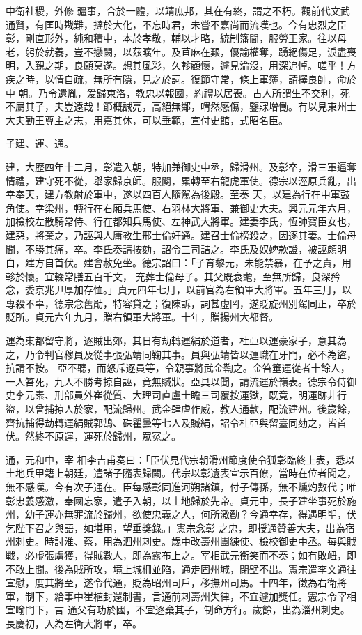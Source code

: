 \begin{pinyinscope}
 中衛社稷，外修
 疆事，合於一體，以靖庶邦，其在有終，謂之不朽。觀前代文武通賢，有匡時戡難，撻於大化，不忘時君，未嘗不嘉尚而流嘆也。今有忠烈之臣彰，剛直形外，純和積中，本於孝敬，輔以才略，統制籓閫，服勞王家。往以母老，躬於就養，豈不戀闕，以茲曠年。及苴麻在艱，優諭權奪，踴絕傷足，淚盡喪明，入覲之期，良願莫遂。想其風彩，久軫顧懷，遽見淪沒，用深追悼。嗟乎！方疾之時，以情自疏，無所有隱，見之於詞。復節守常，條上軍簿，請擇良帥，命於中
 朝。乃令遺胤，爰歸東洛，教忠以報國，約禮以居喪。古人所謂生不交利，死不屬其子，夫豈遠哉！節概誠亮，高絕無鄰，喟然感傷，鑒寐增慟。有以見東州士大夫勤王尊主之志，用嘉其休，可以垂範，宣付史館，式昭名臣。



 子建、運、通。



 建，大歷四年十二月，彰遣入朝，特加兼御史中丞，歸滑州。及彰卒，滑三軍逼奪情禮，建守死不從，舉家歸京師。服闋，累轉至右龍虎軍使。德宗以涇原兵亂，出幸奉天，建方教射於軍中，遂以四百人隨駕為後殿。至奏
 天，以建為行在中軍鼓角使。幸梁州，轉行在右廂兵馬使、右羽林大將軍、兼御史大夫。興元元年六月，加檢校左散騎常侍、行在都知兵馬使、左神武大將軍。建妻李氏，恆帥寶臣女也，建惡，將棄之，乃誣與人庸教生邢士倫奸通。建召士倫榜殺之，因逐其妻。士倫母聞，不勝其痛，卒。李氏奏請按劾，詔令三司詰之。李氏及奴婢款證，被誣頗明白，建方自首伏。建會赦免坐。德宗詔曰：「子育黎元，未能禁暴，在予之責，用軫於懷。宜輟常膳五百千文，
 充葬士倫母子。其父既衰耄，至無所歸，良深矜念，委京兆尹厚加存恤。」貞元四年七月，以前官為右領軍大將軍。五年三月，以專殺不辜，德宗念舊勛，特容貸之；復陳訴，詞甚虛罔，遂貶旋州別駕同正，卒於貶所。貞元六年九月，贈右領軍大將軍。十年，贈揚州大都督。



 運為東都留守將，逐賊出郊，其日有劫轉運絹於道者，杜亞以運豪家子，意其為之，乃令判官穆員及從事張弘靖同鞠其事。員與弘靖皆以運職在牙門，必不為盜，抗請不按。
 亞不聽，而怒斥逐員等，令親事將武金鞫之。金笞箠運從者十餘人，一人笞死，九人不勝考掠自誣，竟無贓狀。亞具以聞，請流運於嶺表。德宗令侍御史李元素、刑部員外崔從質、大理司直盧士瞻三司覆按運獄，既竟，明運跡非行盜，以曾捕掠人於家，配流歸州。武金肆虐作威，教人通款，配流建州。後歲餘，齊抗捕得劫轉運絹賊郭鵠、硃瞿曇等七人及贓絹，詔令杜亞與留臺同劾之，皆首伏。然終不原運，運死於歸州，眾冤之。



 通，元和中，宰
 相李吉甫奏曰：「臣伏見代宗朝滑州節度使令狐彰臨終上表，悉以土地兵甲籍上朝廷，遣諸子隨表歸闕。代宗以彰遺表宣示百僚，當時在位者聞之，無不感嘆。今有次子通在。臣每感彰同進河朔諸鎮，付子傳孫，無不燻灼數代；唯彰忠義感激，奉國忘家，遣子入朝，以土地歸於先帝。貞元中，長子建坐事死於施州，幼子運亦無罪流於歸州，欲使忠義之人，何所激勸？今通幸存，得遇明聖，伏乞陛下召之與語，如堪用，望垂獎錄。」憲宗念彰
 之忠，即授通贊善大夫，出為宿州刺史。時討淮、蔡，用為泗州刺史。歲中改壽州團練使、檢校御史中丞。每與賊戰，必虛張虜獲，得賊數人，即為露布上之。宰相武元衡笑而不奏；如有敗衄，即不敢上聞。後為賊所攻，境上城柵並陷，通走固州城，閉壁不出。憲宗遣李文通往宣慰，度其將至，遂令代通，貶為昭州司戶，移撫州司馬。十四年，徵為右衛將軍，制下，給事中崔植封還制書，言通前刺壽州失律，不宜遽加獎任。憲宗令宰相宣喻門下，言
 通父有功於國，不宜逐棄其子，制命方行。歲餘，出為淄州刺史。長慶初，入為左衛大將軍，卒。




\end{pinyinscope}
